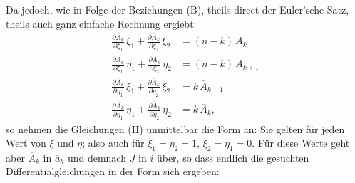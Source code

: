 Da jedoch, wie in Folge der Beziehungen (B), theils direct der
Euler'sche Satz, theils auch ganz einfache Rechnung ergiebt:
\[
\begin{aligned}
\frac{\partial \overline{A}_k}{\partial \xi_1}\,\xi_1 + \frac{\partial \overline{A}_k}{\partial \xi_2}\,\xi_2 &= (n-k)\,\overline{A}_k\\
\frac{\partial \overline{A}_k}{\partial \xi_1}\,\eta_1 + \frac{\partial \overline{A}_k}{\partial \xi_2}\,\eta_2 &= (n-k)\,\overline{A}_{k+1}\\
\frac{\partial \overline{A}_k}{\partial \eta_1}\,\xi_1 + \frac{\partial \overline{A}_k}{\partial \eta_2}\,\xi_2 &= k\,\overline{A}_{k-1}\\
\frac{\partial \overline{A}_k}{\partial \eta_1}\,\eta_1 + \frac{\partial \overline{A}_k}{\partial \eta_2}\,\eta_2 &= k\,\overline{A}_k,
\end{aligned}
\]
so nehmen die Gleichungen (II) unmittelbar die Form an:
Sie gelten für jeden Wert von $\xi$ und $\eta$; also auch für $\xi_1 = \eta_2 = 1$, $\xi_2 = \eta_1 = 0$.
Für diese Werte geht aber $\overline{A}_k$ in $\overline{a}_k$ und demnach $J$ in $i$ über, so dass
endlich die gesuchten Differentialgleichungen in der Form sich ergeben:


